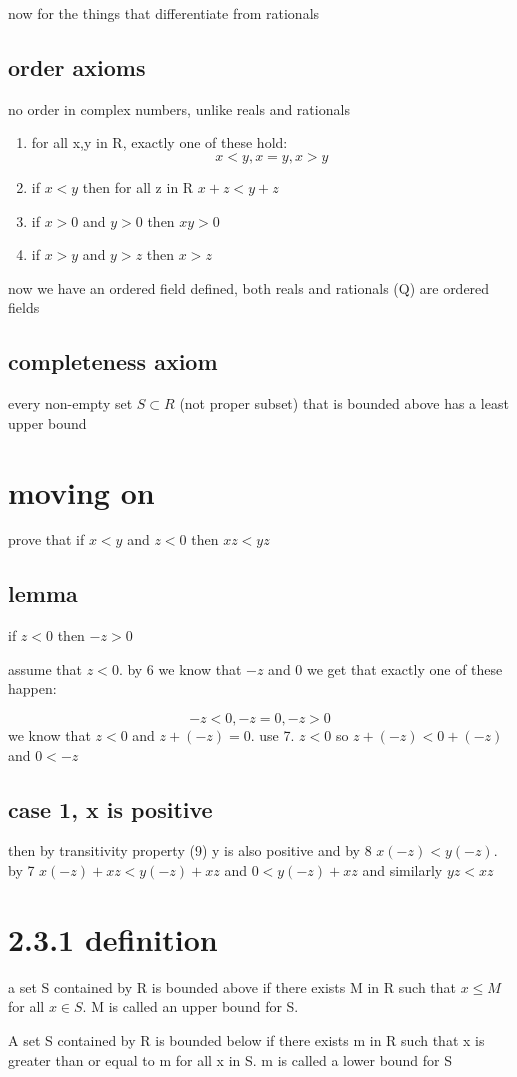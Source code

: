 \documentclass[letterpaper]{article}
\begin{document}
now for the things that differentiate from rationals
\subsection*{order axioms}
no order in complex numbers, unlike reals and rationals
\begin{enumerate}
\item
for all x,y in R, exactly one of these hold:
\[x<y, x=y, x>y\]
\item
if $x<y$ then for all z in R $x+z<y+z$
\item
if $x>0$ and $y>0$ then $xy>0$
\item
if $x>y$ and $y>z$ then $x>z$
\end{enumerate}
now we have an ordered field defined, both reals and rationals (Q) are ordered fields
\subsection*{completeness axiom}
every non-empty set $S\subset R$ (not proper subset) that is bounded above has a least upper bound
\section*{moving on}
prove that if $x<y$ and $z<0$ then $xz<yz$
\subsection*{lemma}
if $z<0$ then $-z>0$

assume that $z<0$. by 6 we know that $-z$ and 0 we get that exactly one of these happen:

\[-z<0, -z=0,-z>0\]
we know that $z<0$ and $z+(-z)=0$. use 7. $z<0$ so $z+(-z)<0+(-z)$ and $0<-z$
\subsection*{case 1, x is positive}
then by transitivity property (9) y is also positive and by 8 $x(-z)<y(-z)$.
by 7 $x(-z)+xz<y(-z)+xz$ and $0<y(-z)+xz$ and similarly $yz<xz$

\section*{2.3.1 definition}
a set S contained by R is bounded above if there exists M in R such that $x\le M$ for all $x\in S$. M is called an upper bound for S.

A set S contained by R is bounded below if there exists m in R such that x is greater than or equal to m for all x in S. m is called a lower bound for S
\end{document}
